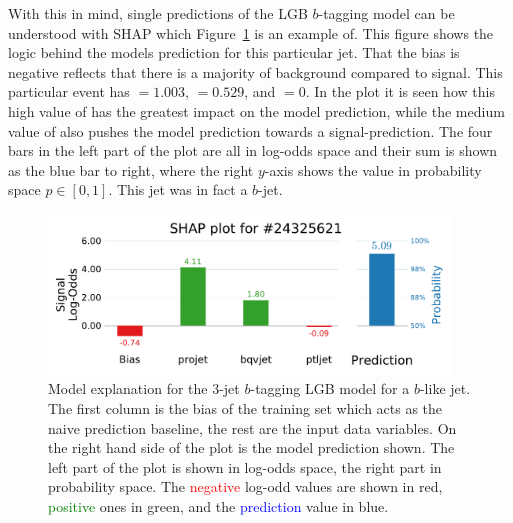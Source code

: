 With this in mind, single predictions of the LGB $b$-tagging model can be understood with SHAP which Figure~\ref{fig:q:shap_single_prediction_3j} is an example of. This figure shows the logic behind the models prediction for this particular jet. That the bias is negative reflects that there is a majority of background compared to signal. This particular event has $=1.003$, $=0.529$, and $=0$. In the plot it is seen how this high value of  has the greatest impact on the model prediction, while the medium value of  also pushes the model prediction towards a signal-prediction. The four bars in the left part of the plot are all in log-odds space and their sum is shown as the blue bar to right, where the right $y$-axis shows the value in probability space $p\in [0,1]$. This jet was in fact a $b$-jet.

\begin{figure}[h!]
  \centerfloat
  \includegraphics[width=0.95\textwidth, trim=0 0 0 40, clip]{figures/quarks/shap_values-down_sample=1.00-ML_vars=vertex-selection=b-ejet_min=4-n_iter_RS_lgb=99-n_iter_RS_xgb=9-cdot_cut=0.90-version=19-njet=3loc=24325621.pdf}
  \caption[SHAP 3-Jet Model Explanation for $b$-like Jet]
          {Model explanation for the 3-jet $b$-tagging LGB model for a $b$-like jet. The first column is the bias of the training set which acts as the naive prediction baseline, the rest are the input data variables. On the right hand side of the plot is the model prediction shown. The left part of the plot is shown in log-odds space, the right part in probability space. The \textcolor{red}{negative} log-odd values are shown in red, \textcolor{green}{positive} ones in green, and the \textcolor{blue}{prediction} value in blue. 
          } 
  \label{fig:q:shap_single_prediction_3j}
\end{figure}



